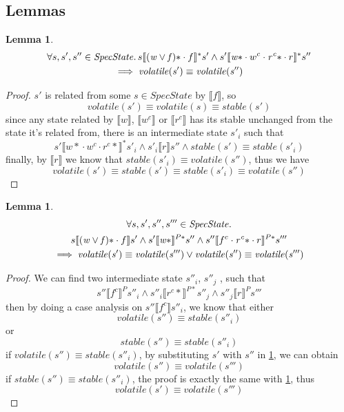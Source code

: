 \documentclass[letterpaper,twocolumn,10pt]{article}
\newtheorem{lemma}[theorem]{Lemma}
\theoremstyle{definition}
\begin{document}
\subsection{Lemmas}

\begin{lemma}\label{lemma-2-1}
\begin{multline*}
	\forall s, s', s'' \in \mathit{SpecState} \ldotp s \llbracket \mathit{(w \lor f)\ast} \cdot f \rrbracket^* s' \land s' \llbracket \mathit{w\ast} \cdot w^c \cdot \mathit{r^c\ast} \cdot r \rrbracket^* s'' \\
	  \implies \mathit{volatile(s')} \equiv \mathit{volatile(s'')}
\end{multline*}
\end{lemma}
\begin{proof}
	$s'$ is related from some $s \in \mathit{SpecState}$ by $\llbracket f \rrbracket$, so
		$$\mathit{volatile(s')} \equiv \mathit{volatile(s)} \equiv \mathit{stable(s')}$$
	since any state related by $\llbracket w \rrbracket$, $\llbracket w^c \rrbracket$ or $\llbracket r^c \rrbracket$ has its stable unchanged from the state it's related from, there is an intermediate state $s'_i$ such that
		$$s' \llbracket {w*} \cdot w^c \cdot {r^c *} \rrbracket^* s'_i \land s'_i \llbracket r \rrbracket s'' \land stable(s') \equiv stable(s'_i)$$
	finally, by $\llbracket r \rrbracket$ we know that $\mathit{stable(s'_i) \equiv volatile(s'')}$, thus we have
		$$\mathit{volatile(s') \equiv stable(s') \equiv stable(s'_i) \equiv volatile(s'')}$$
\end{proof}

\begin{lemma}\label{lemma-2-2}
\begin{multline*}
      \forall s, s', s'', s''' \in \mathit{SpecState} \ldotp \\
      s \llbracket \mathit{(w \lor f)\ast} \cdot f \rrbracket s' \land
	  s' \llbracket \mathit{w\ast} \rrbracket^{P*} s'' \land
	  s'' \llbracket f^c \cdot \mathit{r^c\ast} \cdot r \rrbracket^{P*} s'''\\ \implies \mathit{volatile(s')} \equiv \mathit{volatile(s''')} \lor \mathit{volatile(s'')} \equiv \mathit{volatile(s''')}
\end{multline*}
\end{lemma}
\begin{proof}
	We can find two intermediate state $s''_i$, $s''_j$ , such that $$s'' \llbracket f^c \rrbracket^P s''_i \land s''_i \llbracket r^c* \rrbracket^{P*} s''_j \land s''_j \llbracket r \rrbracket^P s'''$$
	then by doing a case analysis on $s'' \llbracket f^c \rrbracket s''_i$, we know that either $$\mathit{volatile(s'') \equiv stable(s''_i)}$$ or $$\mathit{stable(s'') \equiv stable(s''_i)}$$
	if $\mathit{volatile(s'') \equiv stable(s''_i)}$, by substituting $s'$ with $s''$ in
	\cref{lemma-2-1}, we can obtain $$\mathit{volatile(s'') \equiv volatile(s''')}$$
	if $\mathit{stable(s'') \equiv stable(s''_i)}$, the proof is exactly the same with \cref{lemma-2-1}, thus $$\mathit{volatile(s') \equiv volatile(s''')}$$
\end{proof}
\end{document}
